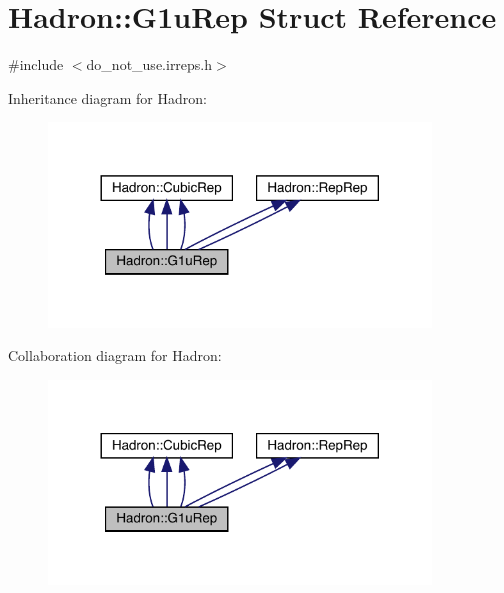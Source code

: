 \hypertarget{structHadron_1_1G1uRep}{}\section{Hadron\+:\+:G1u\+Rep Struct Reference}
\label{structHadron_1_1G1uRep}


{\ttfamily \#include $<$do\+\_\+not\+\_\+use.\+irreps.\+h$>$}



Inheritance diagram for Hadron\+:
\nopagebreak
\begin{figure}[H]
\begin{center}
\leavevmode
\includegraphics[width=288pt]{d8/d9e/structHadron_1_1G1uRep__inherit__graph}
\end{center}
\end{figure}


Collaboration diagram for Hadron\+:
\nopagebreak
\begin{figure}[H]
\begin{center}
\leavevmode
\includegraphics[width=288pt]{d2/d79/structHadron_1_1G1uRep__coll__graph}
\end{center}
\end{figure}
